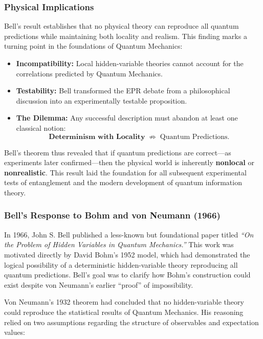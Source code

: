 \subsubsection{Physical Implications}

Bell’s result establishes that no physical theory can reproduce all quantum predictions while maintaining both locality and realism.  
This finding marks a turning point in the foundations of Quantum Mechanics:

\begin{itemize}
    \item \textbf{Incompatibility:}  
    Local hidden-variable theories cannot account for the correlations predicted by Quantum Mechanics.

    \item \textbf{Testability:}  
    Bell transformed the EPR debate from a philosophical discussion into an experimentally testable proposition.

    \item \textbf{The Dilemma:}  
    Any successful description must abandon at least one classical notion:
    \[
    \textbf{Determinism with Locality} \;\;\not\Rightarrow\;\; \text{Quantum Predictions.}
    \]
\end{itemize}

Bell’s theorem thus revealed that if quantum predictions are correct—as experiments later confirmed—then the physical world is inherently \textbf{nonlocal} or \textbf{nonrealistic}.  
This result laid the foundation for all subsequent experimental tests of entanglement and the modern development of quantum information theory.

\subsubsection{Bell’s Response to Bohm and von Neumann (1966)}

In 1966, John S. Bell published a less-known but foundational paper titled \textit{“On the Problem of Hidden Variables in Quantum Mechanics.”}  
This work was motivated directly by David Bohm’s 1952 model, which had demonstrated the logical possibility of a deterministic hidden-variable theory reproducing all quantum predictions.  
Bell’s goal was to clarify how Bohm’s construction could exist despite von Neumann’s earlier ``proof'' of impossibility.

Von Neumann’s 1932 theorem had concluded that no hidden-variable theory could reproduce the statistical results of Quantum Mechanics.  
His reasoning relied on two assumptions regarding the structure of observables and expectation values:

